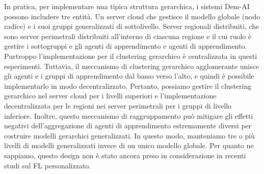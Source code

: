 In pratica, per implementare una tipica struttura gerarchica, i sistemi Dem-AI possono includere tre entità. Un server cloud che gestisce il modello globale (nodo radice) e i suoi gruppi generalizzati di sottolivello. Server regionali distribuiti, che sono server perimetrali distribuiti all'interno di ciascuna regione e il cui ruolo è gestire i sottogruppi e gli agenti di apprendimento e agenti di apprendimento.
Purtroppo l'implementazione per il clustering gerarchico è centralizzata in questi esperimenti. Tuttavia, il meccanismo di clustering gerarchico agglomerante unisce gli agenti e i gruppi di apprendimento dal basso verso l'alto, e quindi è possibile implementarlo in modo decentralizzato. Pertanto, possiamo gestire il clustering gerarchico nel server cloud per i livelli superiori e l'implementazione decentralizzata per le regioni nei server perimetrali per i gruppi di livello inferiore. Inoltre, questo meccanismo di raggruppamento può mitigare gli effetti negativi dell'aggregazione di agenti di apprendimento estremamente diversi per costruire modelli gerarchici generalizzati. In questo modo, manteniamo tre o più livelli di modelli generalizzati invece di un unico modello globale. Per quanto ne sappiamo, questo design non è stato ancora preso in considerazione in recenti studi sul FL personalizzato.